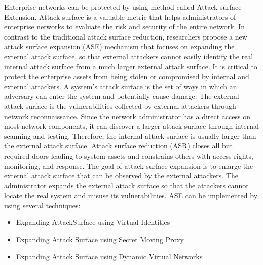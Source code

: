 \documentclass[14pt]{article}
\begin{document}
	Enterprise networks can be protected by using method called Attack surface Extension. Attack surface is a valuable metric that helps administrators of enterprise networks to evaluate the risk and security of the entire network. In contrast to the traditional attack surface reduction, researchers propose a new attack surface expansion (ASE) mechanism that focuses on expanding the external attack surface, so that external attackers cannot easily identify the real internal attack surface from a much larger external attack surface. It is critical to protect the enterprise assets from being stolen or compromised by internal and external attackers. A system’s attack surface is the set of ways in which an adversary can enter the system and potentially cause damage. The external attack surface is the vulnerabilities collected by external attackers through network reconnaissance. Since the network administrator has a direct access on most network components, it can discover a larger attack surface through internal scanning and testing. Therefore, the internal attack surface is usually larger than the external attack surface. Attack surface reduction (ASR) closes all but required doors leading to system assets and constrains others with access rights, monitoring, and response. The goal of attack surface expansion is to enlarge the external attack surface that can be observed by the external attackers. The administrator expands the external attack surface so that the attackers cannot locate the real system and misuse its vulnerabilities. ASE can be implemented by using several techniques:
	\begin{itemize} 
	\item Expanding AttackSurface using Virtual Identities
	\item Expanding Attack Surface using Secret Moving Proxy
	\item Expanding Attack Surface using Dynamic Virtual Networks
	\end{itemize}
\end{document}
